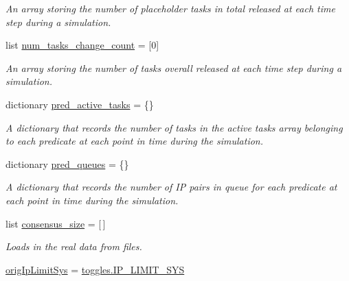 \begin{DoxyCompactItemize}
\begin{DoxyCompactList}\small\item\em An array storing the number of placeholder tasks in total released at each time step during a simulation. \end{DoxyCompactList}\item 
list \mbox{\hyperlink{classdynamicfilterapp_1_1test__simulations_1_1_simulation_test_a7c671c228186999a1381c6879ce6fb33}{num\+\_\+tasks\+\_\+change\+\_\+count}} = \mbox{[}0\mbox{]}
\begin{DoxyCompactList}\small\item\em An array storing the number of tasks overall released at each time step during a simulation. \end{DoxyCompactList}\item 
dictionary \mbox{\hyperlink{classdynamicfilterapp_1_1test__simulations_1_1_simulation_test_a99bc70b457bf163e498bda36817b9b4c}{pred\+\_\+active\+\_\+tasks}} = \{\}
\begin{DoxyCompactList}\small\item\em A dictionary that records the number of tasks in the active tasks array belonging to each predicate at each point in time during the simulation. \end{DoxyCompactList}\item 
dictionary \mbox{\hyperlink{classdynamicfilterapp_1_1test__simulations_1_1_simulation_test_a760f519159d3fa0aab64410908d558e8}{pred\+\_\+queues}} = \{\}
\begin{DoxyCompactList}\small\item\em A dictionary that records the number of IP pairs in queue for each predicate at each point in time during the simulation. \end{DoxyCompactList}\item 
list \mbox{\hyperlink{classdynamicfilterapp_1_1test__simulations_1_1_simulation_test_a3524ef5465572a82fd0b944fe640b1ac}{consensus\+\_\+size}} = \mbox{[}$\,$\mbox{]}
\begin{DoxyCompactList}\small\item\em Loads in the real data from files. \end{DoxyCompactList}\item 
\mbox{\hyperlink{classdynamicfilterapp_1_1test__simulations_1_1_simulation_test_adc00619d9e66b05d4ac5582196ec80be}{orig\+Ip\+Limit\+Sys}} = \mbox{\hyperlink{namespacedynamicfilterapp_1_1toggles_ab27926159525360b29661a4778b0ce7c}{toggles.\+I\+P\+\_\+\+L\+I\+M\+I\+T\+\_\+\+S\+YS}}
\item 

\end{DoxyCompactItemize}
